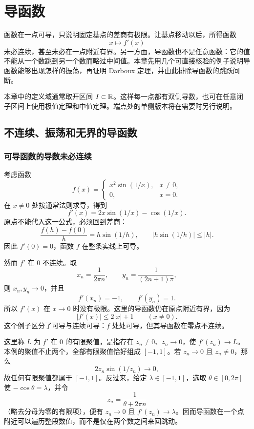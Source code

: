 \chapter{导函数}
\label{chap:derivative-darboux}

函数在一点可导，只说明固定基点的差商有极限。让基点移动以后，所得函数
\[
 x\longmapsto f'(x)
\]
未必连续，甚至未必在一点附近有界。另一方面，导函数也不是任意函数：它的值不能从一个数跳到另一个数而略过中间值。本章先用几个可直接核验的例子说明导函数能够出现怎样的振荡，再证明 Darboux 定理，并由此排除导函数的跳跃间断。

本章中的定义域通常取开区间 \(I\subset\mathbb{R}\)。这样每一点都有双侧导数，也可在任意闭子区间上使用极值定理和中值定理。端点处的单侧版本将在需要时另行说明。

\section{不连续、振荡和无界的导函数}

\subsection{可导函数的导数未必连续}

考虑函数
\[
 f(x)=
 \begin{cases}
  x^2\sin(1/x),&x\ne0,\\
  0,&x=0.
 \end{cases}
\]
在 \(x\ne0\) 处按通常法则求导，得到
\[
 f'(x)=2x\sin(1/x)-\cos(1/x).
\]
原点不能代入这一公式，必须回到差商：
\[
 \frac{f(h)-f(0)}{h}=h\sin(1/h),
 \qquad
 \left|h\sin(1/h)\right|\le |h|.
\]
因此 \(f'(0)=0\)，函数 \(f\) 在整条实线上可导。

然而 \(f'\) 在 \(0\) 不连续。取
\[
 x_n=\frac1{2\pi n},
 \qquad
 y_n=\frac1{(2n+1)\pi},
\]
则 \(x_n,y_n\to0\)，并且
\[
 f'(x_n)=-1,
 \qquad
 f'(y_n)=1.
\]
所以 \(f'(x)\) 在 \(x\to0\) 时没有极限。这里的导函数仍在原点附近有界，因为
\[
 |f'(x)|\le 2|x|+1
 \qquad(x\ne0).
\]
这个例子区分了可导与连续可导：\(f\) 处处可导，但其导函数在零点不连续。

这里称 \(L\) 为 \(f'\) 在 \(0\) 的有限聚值，是指存在 \(z_n\ne0\)、\(z_n\to0\)，使 \(f'(z_n)\to L\)。本例的聚值不止两个，全部有限聚值恰好组成 \([-1,1]\)。若 \(z_n\to0\) 且 \(z_n\ne0\)，那么
\[
 2z_n\sin(1/z_n)\to0,
\]
故任何有限聚值都属于 \([-1,1]\)。反过来，给定 \(\lambda\in[-1,1]\)，选取 \(\theta\in[0,2\pi]\) 使 \(-\cos\theta=\lambda\)，并令
\[
 z_n=\frac1{\theta+2\pi n}
\]
（略去分母为零的有限项），便有 \(z_n\to0\) 且 \(f'(z_n)\to\lambda\)。因而导函数在一个点附近可以遍历整段数值，而不是仅在两个数之间来回跳动。

